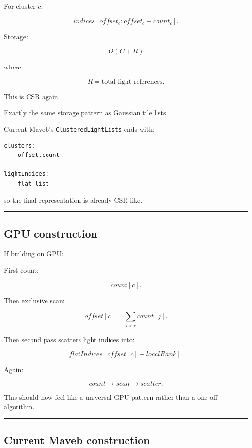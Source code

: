 For cluster \(c\):

\[
indices[
offset_c:
offset_c+count_c
].
\]

Storage:

\[
O(C+R)
\]

where:

\[
R=
\text{total light references}.
\]

This is CSR again.

Exactly the same storage pattern as Gaussian tile lists.

Current Maveb's \texttt{ClusteredLightLists} ends with:

\begin{verbatim}
clusters:
    offset,count

lightIndices:
    flat list
\end{verbatim}

so the final representation is already CSR-like.

\begin{center}\rule{0.5\linewidth}{0.5pt}\end{center}

\subsection{GPU construction}\label{04-visual-computing-ii-ch040-gpu-construction}

If building on GPU:

First count:

\[
count[c].
\]

Then exclusive scan:

\[
offset[c]
=
\sum_{j<c}count[j].
\]

Then second pass scatters light indices into:

\[
flatIndices[
offset[c]+localRank
].
\]

Again:

\[
\boxed{
count
\rightarrow
scan
\rightarrow
scatter.
}
\]

This should now feel like a universal GPU pattern rather than a one-off algorithm.

\begin{center}\rule{0.5\linewidth}{0.5pt}\end{center}

\subsection{Current Maveb construction}\label{04-visual-computing-ii-ch040-current-maveb-construction}

